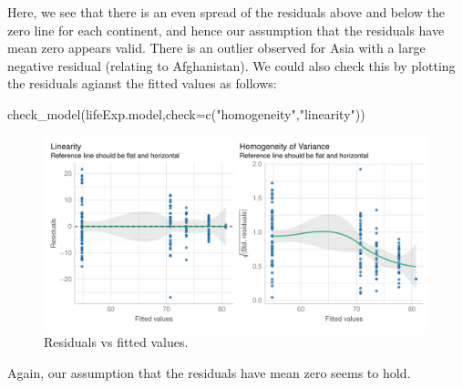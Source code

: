 \documentclass[
  letterpaper,
  DIV=11,
  numbers=noendperiod]{scrartcl}
\newenvironment{Shaded}{\begin{snugshade}}{\end{snugshade}}
\newcommand{\AttributeTok}[1]{\textcolor[rgb]{0.40,0.45,0.13}{#1}}
\newcommand{\FunctionTok}[1]{\textcolor[rgb]{0.28,0.35,0.67}{#1}}
\newcommand{\NormalTok}[1]{\textcolor[rgb]{0.00,0.23,0.31}{#1}}
\newcommand{\StringTok}[1]{\textcolor[rgb]{0.13,0.47,0.30}{#1}}
\begin{document}
Here, we see that there is an even spread of the residuals above and
below the zero line for each continent, and hence our assumption that
the residuals have mean zero appears valid. There is an outlier observed
for Asia with a large negative residual (relating to Afghanistan). We
could also check this by plotting the residuals agianst the fitted
values as follows:

\begin{Shaded}
\begin{Highlighting}[]
\FunctionTok{check\_model}\NormalTok{(lifeExp.model,}\AttributeTok{check=}\FunctionTok{c}\NormalTok{(}\StringTok{"homogeneity"}\NormalTok{,}\StringTok{"linearity"}\NormalTok{))}
\end{Highlighting}
\end{Shaded}

\begin{figure}[H]

{\centering \includegraphics{index_files/figure-pdf/unnamed-chunk-20-1.pdf}

}

\caption{Residuals vs fitted values.}

\end{figure}%

Again, our assumption that the residuals have mean zero seems to hold.
\end{document}
